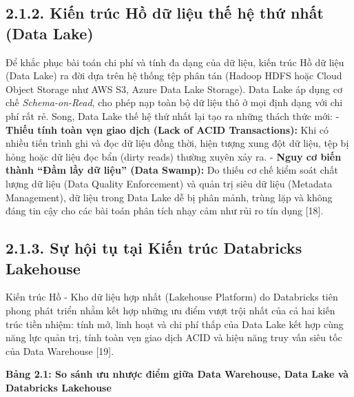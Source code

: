 \documentclass[
  13pt,
  a4paper,
]{report}
\begin{document}
\subsection{2.1.2. Kiến trúc Hồ dữ liệu thế hệ thứ nhất (Data
Lake)}\label{kiux1ebfn-truxfac-hux1ed3-dux1eef-liux1ec7u-thux1ebf-hux1ec7-thux1ee9-nhux1ea5t-data-lake}

Để khắc phục bài toán chi phí và tính đa dạng của dữ liệu, kiến trúc Hồ
dữ liệu (Data Lake) ra đời dựa trên hệ thống tệp phân tán (Hadoop HDFS
hoặc Cloud Object Storage như AWS S3, Azure Data Lake Storage). Data
Lake áp dụng cơ chế \emph{Schema-on-Read}, cho phép nạp toàn bộ dữ liệu
thô ở mọi định dạng với chi phí rất rẻ. Song, Data Lake thế hệ thứ nhất
lại tạo ra những thách thức mới: - \textbf{Thiếu tính toàn vẹn giao dịch
(Lack of ACID Transactions):} Khi có nhiều tiến trình ghi và đọc dữ liệu
đồng thời, hiện tượng xung đột dữ liệu, tệp bị hỏng hoặc dữ liệu đọc bẩn
(dirty reads) thường xuyên xảy ra. - \textbf{Nguy cơ biến thành ``Đầm
lầy dữ liệu'' (Data Swamp):} Do thiếu cơ chế kiểm soát chất lượng dữ
liệu (Data Quality Enforcement) và quản trị siêu dữ liệu (Metadata
Management), dữ liệu trong Data Lake dễ bị phân mảnh, trùng lặp và không
đáng tin cậy cho các bài toán phân tích nhạy cảm như rủi ro tín dụng
{[}18{]}.

\subsection{2.1.3. Sự hội tụ tại Kiến trúc Databricks
Lakehouse}\label{sux1ef1-hux1ed9i-tux1ee5-tux1ea1i-kiux1ebfn-truxfac-databricks-lakehouse}

Kiến trúc Hồ - Kho dữ liệu hợp nhất (Lakehouse Platform) do Databricks
tiên phong phát triển nhằm kết hợp những ưu điểm vượt trội nhất của cả
hai kiến trúc tiền nhiệm: tính mở, linh hoạt và chi phí thấp của Data
Lake kết hợp cùng năng lực quản trị, tính toàn vẹn giao dịch ACID và
hiệu năng truy vấn siêu tốc của Data Warehouse {[}19{]}.

\textbf{Bảng 2.1: So sánh ưu nhược điểm giữa Data Warehouse, Data Lake
và Databricks Lakehouse}
\end{document}
